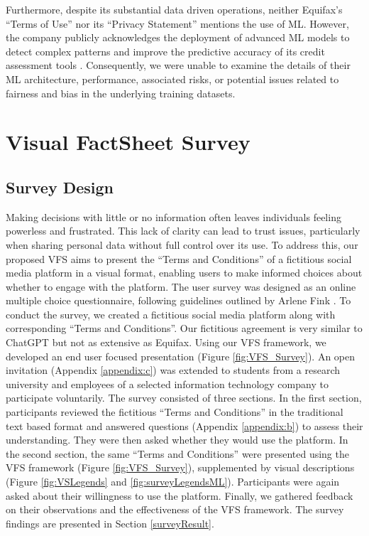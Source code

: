 \documentclass[manuscript,review,anonymous]{acmart}
\begin{document}
	Furthermore, despite its substantial data driven operations, neither Equifax’s \enquote{Terms of Use} nor its \enquote{Privacy Statement} mentions the use of ML. However, the company publicly acknowledges the deployment of advanced ML models to detect complex patterns and improve the predictive accuracy of its credit assessment tools \cite{equifaxAI}. Consequently, we were unable to examine the details of their ML architecture, performance, associated risks, or potential issues related to fairness and bias in the underlying training datasets.

\section{Visual FactSheet Survey}

\subsection{Survey Design}
	Making decisions with little or no information often leaves individuals feeling powerless and frustrated. This lack of clarity can lead to trust issues, particularly when sharing personal data without full control over its use. To address this, our proposed VFS aims to present the \enquote{Terms and Conditions} of a fictitious social media platform in a visual format, enabling users to make informed choices about whether to engage with the platform. The user survey was designed as an online multiple choice questionnaire, following guidelines outlined by Arlene Fink \cite{alma991013701999705153}. To conduct the survey, we created a fictitious social media platform along with corresponding \enquote{Terms and Conditions}. Our fictitious agreement is very similar to ChatGPT but not as extensive as Equifax. Using our VFS framework, we developed an end user focused presentation (Figure \ref{fig:VFS_Survey}). An open invitation (Appendix \ref{appendix:c}) was extended to students from a research university and employees of a selected information technology company to participate voluntarily. The survey consisted of three sections. In the first section, participants reviewed the fictitious “Terms and Conditions” in the traditional text based format and answered questions (Appendix \ref{appendix:b}) to assess their understanding. They were then asked whether they would use the platform. In the second section, the same “Terms and Conditions” were presented using the VFS framework (Figure \ref{fig:VFS_Survey}), supplemented by visual descriptions (Figure \ref{fig:VSLegends} and \ref{fig:surveyLegendsML}). Participants were again asked about their willingness to use the platform. Finally, we gathered feedback on their observations and the effectiveness of the VFS framework. The survey findings are presented in Section \ref{surveyResult}.
\end{document}
